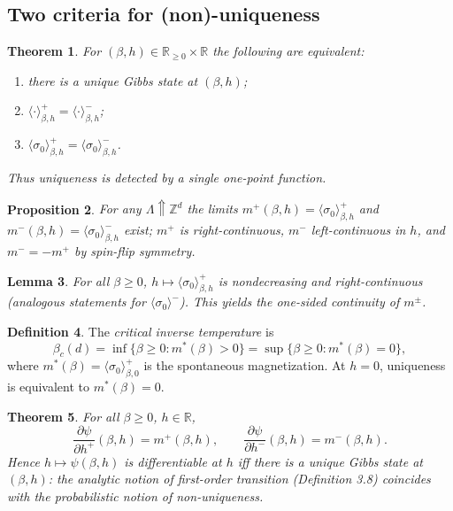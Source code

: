 \documentclass[11pt]{article}
\theoremstyle{plain}
\newtheorem{theorem}{Theorem}
\newtheorem{lemma}[theorem]{Lemma}
\newtheorem{proposition}[theorem]{Proposition}
\theoremstyle{definition}
\newtheorem{definition}[theorem]{Definition}
\theoremstyle{remark}
\newcommand{\Z}{\mathbb{Z}}
\newcommand{\R}{\mathbb{R}}
\newcommand{\Rgeq}{\R_{\ge 0}}
\newcommand{\incr}{\Uparrow}        %
\newcommand{\La}{\Lambda}
\newcommand{\sg}{\sigma}
\newcommand{\meanp}[1]{\langle #1 \rangle^{+}}
\newcommand{\meanm}[1]{\langle #1 \rangle^{-}}
\begin{document}
\subsection{Two criteria for (non)-uniqueness}
\setcounter{theorem}{27}%
\begin{theorem}
For $(\beta,h)\in\Rgeq\times\R$ the following are equivalent:
\begin{enumerate}
  \item there is a unique Gibbs state at $(\beta,h)$;
  \item $\meanp{\cdot}_{\beta,h}=\meanm{\cdot}_{\beta,h}$;
  \item $\meanp{\sg_0}_{\beta,h}=\meanm{\sg_0}_{\beta,h}$.
\end{enumerate}
Thus uniqueness is detected by a single one-point function.
\end{theorem}

\begin{proposition}
For any $\La\incr\Z^d$ the limits $m^{+}(\beta,h)=\meanp{\sg_0}_{\beta,h}$ and
$m^{-}(\beta,h)=\meanm{\sg_0}_{\beta,h}$ exist; $m^{+}$ is right-continuous,
$m^{-}$ left-continuous in $h$, and $m^{-}=-m^{+}$ by spin-flip symmetry.
\end{proposition}

\setcounter{theorem}{30}%
\begin{lemma}
For all $\beta\ge0$, $h\mapsto\meanp{\sg_0}_{\beta,h}$ is nondecreasing and
right-continuous (analogous statements for $\meanm{\sg_0}$). This yields the
one-sided continuity of $m^{\pm}$.
\end{lemma}

\begin{definition}
The \emph{critical inverse temperature} is
\[
  \beta_c(d) = \inf\{\beta\ge0 : m^*(\beta)>0\}
             = \sup\{\beta\ge0 : m^*(\beta)=0\},
\]
where $m^*(\beta)=\meanp{\sg_0}_{\beta,0}$ is the spontaneous magnetization. At
$h=0$, uniqueness is equivalent to $m^*(\beta)=0$.
\end{definition}

\setcounter{theorem}{33}%
\begin{theorem}
For all $\beta\ge0$, $h\in\R$,
\[
  \frac{\partial\psi}{\partial h^+}(\beta,h)=m^{+}(\beta,h),\qquad
  \frac{\partial\psi}{\partial h^-}(\beta,h)=m^{-}(\beta,h).
\]
Hence $h\mapsto\psi(\beta,h)$ is differentiable at $h$ \emph{iff} there is a
unique Gibbs state at $(\beta,h)$: the analytic notion of first-order transition
(Definition 3.8) coincides with the probabilistic notion of non-uniqueness.
\end{theorem}
\end{document}
